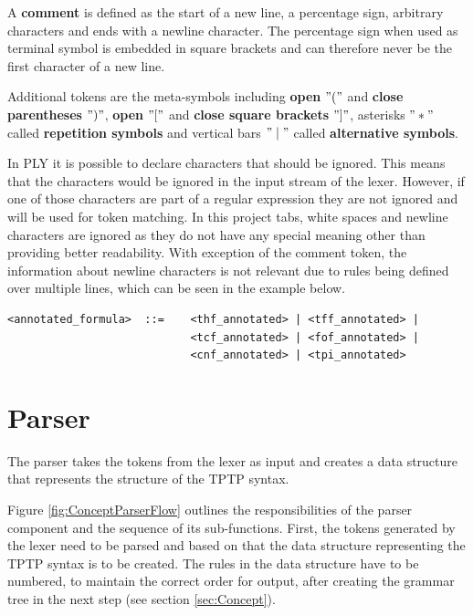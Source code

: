 A \textbf{comment} is defined as the start of a new line, a percentage sign, arbitrary characters and ends with a newline character.
The percentage sign when used as terminal symbol is embedded in square brackets and can therefore never be the first character of a new line.

Additional tokens are the meta-symbols including \textbf{open} $"("$ and \textbf{close parentheses} $")"$, \textbf{open} $"["$ and \textbf{close square brackets} $"]"$, asterisks $"*"$ called \textbf{repetition symbols} and vertical bars $"\mid"$ called \textbf{alternative symbols}.

In PLY it is possible to declare characters that should be ignored. This means that the characters would be ignored in the input stream of the lexer. However, if one of those characters are part of a regular expression they are not ignored and will be used for token matching. In this project tabs, white spaces and newline characters are ignored as they do not have any special meaning other than providing better readability. With exception of the comment token, the information about newline characters is not relevant due to rules being defined over multiple lines, which can be seen in the example below.
\begin{verbatim}
<annotated_formula>  ::=    <thf_annotated> | <tff_annotated> |
                            <tcf_annotated> | <fof_annotated> |
                            <cnf_annotated> | <tpi_annotated>
\end{verbatim}


\section{Parser}\label{sec:ConceptParser}
The parser takes the tokens from the lexer as input and creates a data structure that represents the structure of the \ac{TPTP} syntax.

Figure \ref{fig:ConceptParserFlow} outlines the responsibilities of the parser component and the sequence of its sub-functions.
First, the tokens generated by the lexer need to be parsed and based on that the data structure representing the \ac{TPTP} syntax is to be created.
The rules in the data structure have to be numbered, to maintain the correct order for output, after creating the grammar tree in the next step (see section \ref{sec:Concept}).

